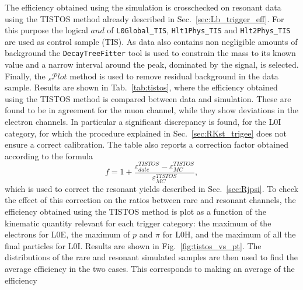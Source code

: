 The efficiency obtained using the simulation
is crosschecked on resonant data using the TISTOS method already described in Sec.~\ref{sec:Lb_trigger_eff}.
%
%
For this purpose the logical $and$ of \verb!L0Global_TIS!, \verb!Hlt1Phys_TIS! and \verb!Hlt2Phys_TIS!
are used as control sample (TIS). As data also contains non negligible amounts of background
the \verb!DecayTreeFitter! tool is used to constrain the \jpsi mass to its known value
and a narrow interval around the peak, dominated by the signal, is selected.
Finally, the $_{s}\mathcal{P}lot$ method is used to remove residual background in the data sample. 
Results are shown in Tab.~\ref{tab:tistos}, where the
efficiency obtained using the TISTOS method is compared between data and simulation.
These are found to be in agreement for the muon channel,
while they show deviations in the electron channels. In particular a significant discrepancy is found,
for the L0I category, for which the procedure explained in Sec.~\ref{sec:RKst_trigee} does not ensure
a correct calibration. The table also reports a correction factor
obtained according to the formula
\begin{equation}
f = 1 + \frac{\varepsilon_{date}^{TISTOS} - \varepsilon_{MC}^{TISTOS}}{\varepsilon_{MC}^{TISTOS}},
\end{equation}
which is used to correct the resonant yields described in Sec.~\ref{sec:Rjpsi}.
%
To check the effect of this correction on the ratios between rare and resonant channels,
the efficiency obtained using the TISTOS method is plot as a function of the kinematic
quantity relevant for each trigger category:
the maximum \pt of the electrons for L0E, the maximum \pt of $p$ and $\pi$ for L0H,
and the maximum \pt of all the final particles for L0I. Results are shown in Fig.~\ref{fig:tistos_vs_pt}.
The \pt distributions of the rare and resonant simulated samples are then used to find
the average efficiency in the two cases. This corresponds to making an average of the efficiency
